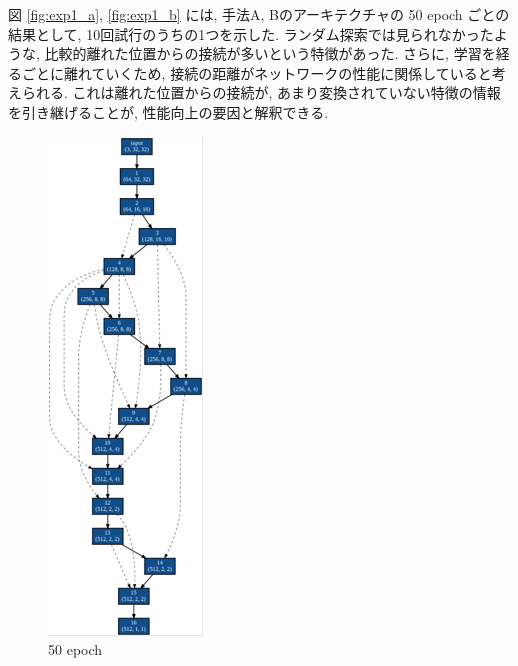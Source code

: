図 \ref{fig:exp1_a}, \ref{fig:exp1_b} には, 手法A, Bのアーキテクチャの 50 epoch ごとの
結果として, 10回試行のうちの1つを示した.
ランダム探索では見られなかったような, 比較的離れた位置からの接続が多いという特徴があった.
さらに, 学習を経るごとに離れていくため, 接続の距離がネットワークの性能に関係していると考えられる.
これは離れた位置からの接続が, あまり変換されていない特徴の情報を引き継げることが,
性能向上の要因と解釈できる.



\begin{figure}[tb]
 \begin{minipage}{0.3\hsize}
 	\begin{center}
 		\includegraphics[clip,scale=0.8]{./fig/04.exp/a50.png}\\
 		50 epoch
 	\end{center}
 \end{minipage}
 \begin{minipage}{0.3\hsize}
 	\begin{center}

\end{center}
\end{minipage}
\end{figure}

